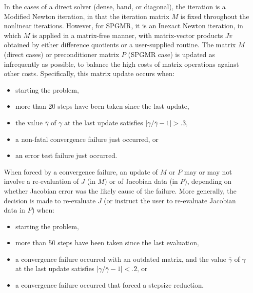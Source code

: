 In the cases of a direct solver (dense, band, or diagonal), the
iteration is a Modified Newton iteration, in that the iteration matrix
$M$ is fixed throughout the nonlinear iterations.  However, for SPGMR,
it is an Inexact Newton iteration, in which $M$ is applied in a
matrix-free manner, with matrix-vector products $Jv$ obtained by
either difference quotients or a user-supplied routine.  The matrix
$M$ (direct cases) or preconditioner matrix $P$ (SPGMR case) is
updated as infrequently as possible, to balance the high costs of
matrix operations against other costs.  Specifically, this matrix
update occurs when:
\begin{itemize}
\item starting the problem,
\item more than 20 steps have been taken since the last update,
\item the value $\bar{\gamma}$ of $\gamma$ at the last update
satisfies $|\gamma/\bar{\gamma} - 1| > .3$,
\item a non-fatal convergence failure just occurred, or
\item an error test failure just occurred.
\end{itemize}
When forced by a convergence failure, an update of $M$ or $P$ may or
may not involve a re-evaluation of $J$ (in $M$) or of Jacobian data
(in $P$), depending on whether Jacobian error was the likely cause of
the failure.  More generally, the decision is made to re-evaluate $J$
(or instruct the user to re-evaluate Jacobian data in $P$) when:
\begin{itemize}
\item starting the problem,
\item more than 50 steps have been taken since the last evaluation,
\item a convergence failure occurred with an outdated matrix, and
the value $\bar{\gamma}$ of $\gamma$ at the last update
satisfies $|\gamma/\bar{\gamma} - 1| < .2$, or
\item a convergence failure occurred that forced a stepsize reduction.
\end{itemize}

